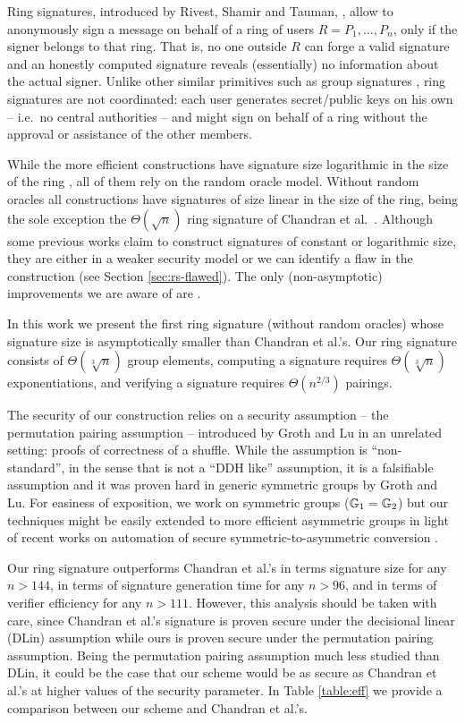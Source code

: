 Ring signatures, introduced by Rivest, Shamir and Tauman, \cite{AC:RivShaTau01}, allow to anonymously sign a message on behalf of a ring of users $R=P_1,\ldots,P_n$, only if the signer belongs to that ring. That is, no one outside $R$ can forge a valid signature and  an honestly computed signature reveals (essentially) no information about the actual signer.  
Unlike other similar primitives such as group signatures \cite{EC:ChaVan91}, ring signatures are not coordinated: each user generates secret/public keys on his own -- i.e.~no central authorities -- and might sign on behalf of a ring without the approval or assistance of the other members.

While the more efficient constructions have signature size logarithmic in the size of the ring \cite{EC:GroKoh15,EC:LLNW16}, all of them rely on the {random oracle model}.
Without random oracles all constructions have signatures of size linear in the size of the ring, being the sole exception the $\Theta(\sqrt{n})$ ring signature of Chandran et al.~\cite{ICALP:ChaGroSah07}. 
Although some previous works claim to construct signatures of constant \cite{ACISP:BosDasRan15} or logarithmic \cite{IET:GriSusPla16} size, they are either in a weaker security model or we can identify a flaw in the construction (see Section \ref{sec:rs-flawed}). The only (non-asymptotic) improvements we are aware of are \cite{TCC:Rafols15,AC:GonHevRaf15}.

In this work we present the first ring signature (without random oracles) whose signature size is asymptotically smaller than Chandran et al.'s. Our ring signature consists of $\Theta(\sqrt[3]{n})$ group elements, computing a signature requires $\Theta(\sqrt[3]{n})$ exponentiations, and verifying a signature requires $\Theta(n^{2/3})$ pairings.

The security of our construction relies on a security assumption -- the {permutation pairing assumption} -- introduced by Groth and Lu \cite{AC:GroLu07} in an unrelated setting: proofs of correctness of a shuffle. While the assumption is ``non-standard'', in the sense that is not a ``DDH like'' assumption, it is a falsifiable assumption and it was proven hard in generic symmetric groups by Groth and Lu. For easiness of exposition, we work on symmetric groups ($\mathbb{G}_1=\mathbb{G}_2$) but our techniques might be easily extended to more efficient asymmetric groups in light of recent works on automation of secure symmetric-to-asymmetric conversion \cite{C:AGOT14a,C:AbeHosOhk16,CCS:AkiGarHoh15}.

Our ring signature outperforms Chandran et al.'s in terms signature size for any $n > 144$, in terms of signature generation time for any $n>96$, and in terms of verifier efficiency for any $n>111$. However, this analysis should be taken with care, since Chandran et al.'s signature is proven secure under the decisional linear (DLin) assumption while ours is proven secure under the permutation pairing assumption. Being the permutation pairing assumption much less studied than DLin, it could be the case that our scheme would be as secure as Chandran et al.'s at higher values of the security parameter. In Table \ref{table:eff} we provide a comparison between our scheme and Chandran et al.'s.


%
